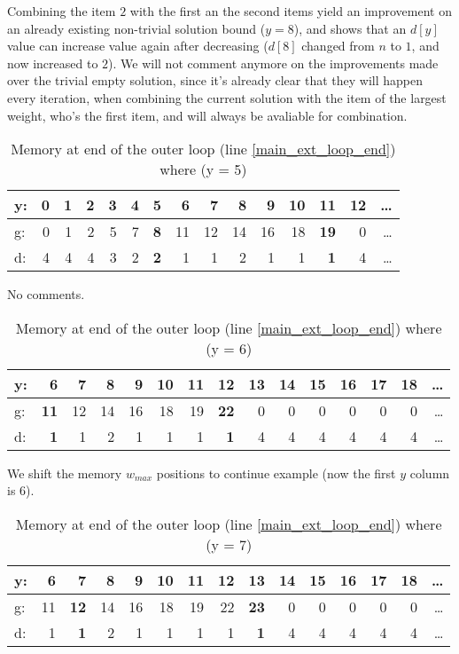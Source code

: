 \documentclass[12pt]{article}
\begin{document}
Combining the item \(2\) with the first an the second items yield an improvement on an already existing non-trivial solution bound (\(y = 8\)), and shows that an \(d[y]\) value can increase value again after decreasing (\(d[8]\) changed from \(n\) to \(1\), and now increased to \(2\)). We will not comment anymore on the improvements made over the trivial empty solution, since it's already clear that they will happen every iteration, when combining the current solution with the item of the largest weight, who's the first item, and will always be avaliable for combination.

\begin{table}[h]
\centering
\caption{Memory at end of the outer loop (line \ref{main_ext_loop_end}) where (y = 5)}
\label{mem_y_5}
\begin{tabular}{l|rrrrrrrrrrrrrr}
y: & 0 &1 &2 &3 &4 &\textbf{5} &6  &7  &8  &9  &10 &\textbf{11} &12 &\dots\\
\hline
g: & 0 &1 &2 &5 &7 &\textbf{8} &11 &12 &14 &16 &18 &\textbf{19} &0 &\dots\\
d: & 4 & 4 & 4 & 3 & 2 & \textbf{2}& 1 & 1 & 2 & 1 & 1 & \textbf{1} & 4 & \dots\\
\end{tabular}
\end{table}

No comments.

\begin{table}[h]
\centering
\caption{Memory at end of the outer loop (line \ref{main_ext_loop_end}) where (y = 6)}
\label{mem_y_6}
\begin{tabular}{l|rrrrrrrrrrrrrr}
y: & \textbf{6} &7   &8  &9  &10 &11 &\textbf{12} &13 &14 &15 &16 &17 &18 &\dots\\
\hline
g: & \textbf{11} &12 &14 &16 &18 &19 &\textbf{22} &0 &0 &0 &0 &0 &0 &\dots\\
d: & \textbf{1} & 1  & 2 & 1 & 1 & 1 & \textbf{1} & 4& 4 & 4 & 4 & 4 & 4 & \dots\\
\end{tabular}
\end{table}

We shift the memory \(w_{max}\) positions to continue example (now the first \(y\) column is \(6\)). 

\begin{table}[H]
\centering
\caption{Memory at end of the outer loop (line \ref{main_ext_loop_end}) where (y = 7)}
\label{mem_y_7}
\begin{tabular}{l|rrrrrrrrrrrrrr}
y: & 6 &\textbf{7} &8 &9 &10 &11 &12 &\textbf{13} &14 &15 &16 &17 &18 &\dots\\
\hline
g: & 11 &\textbf{12} &14 &16 &18 &19 &22 &\textbf{23} &0 &0 &0 &0 &0 &\dots\\
d: & 1 & \textbf{1} & 2 & 1 & 1 & 1 & 1 & \textbf{1} & 4 & 4 & 4 & 4 & 4 & \dots\\
\end{tabular}
\end{table}
\end{document}
